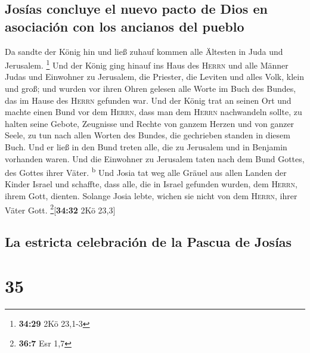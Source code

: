 \hypertarget{josuxedas-concluye-el-nuevo-pacto-de-dios-en-asociaciuxf3n-con-los-ancianos-del-pueblo}{%
\subsection{Josías concluye el nuevo pacto de Dios en asociación con los
ancianos del
pueblo}\label{josuxedas-concluye-el-nuevo-pacto-de-dios-en-asociaciuxf3n-con-los-ancianos-del-pueblo}}

 Da sandte der König hin und ließ zuhauf kommen alle
Ältesten in Juda und Jerusalem. \footnote{\textbf{34:29} 2Kö 23,1-3}
 Und der König ging hinauf ins Haus des \textsc{Herrn}
und alle Männer Judas und Einwohner zu Jerusalem, die Priester, die
Leviten und alles Volk, klein und groß; und wurden vor ihren Ohren
gelesen alle Worte im Buch des Bundes, das im Hause des \textsc{Herrn}
gefunden war.  Und der König trat an seinen Ort und
machte einen Bund vor dem \textsc{Herrn}, dass man dem \textsc{Herrn}
nachwandeln sollte, zu halten seine Gebote, Zeugnisse und Rechte von
ganzem Herzen und von ganzer Seele, zu tun nach allen Worten des Bundes,
die gechrieben standen in diesem Buch.  Und er ließ in
den Bund treten alle, die zu Jerusalem und in Benjamin vorhanden waren.
Und die Einwohner zu Jerusalem taten nach dem Bund Gottes, des Gottes
ihrer Väter. \textsuperscript{b}  Und Josia tat weg alle
Gräuel aus allen Landen der Kinder Israel und schaffte, dass alle, die
in Israel gefunden wurden, dem \textsc{Herrn}, ihrem Gott, dienten.
Solange Josia lebte, wichen sie nicht von dem \textsc{Herrn}, ihrer
Väter Gott. \footnote{\textbf{36:7} Esr 1,7}{[}\textbf{34:32} 2Kö
23,3{]}

\hypertarget{la-estricta-celebraciuxf3n-de-la-pascua-de-josuxedas}{%
\subsection{La estricta celebración de la Pascua de
Josías}\label{la-estricta-celebraciuxf3n-de-la-pascua-de-josuxedas}}

\hypertarget{section-34}{%
\section{35}\label{section-34}}


